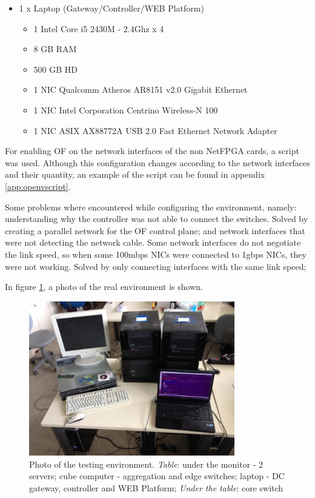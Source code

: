 \documentclass[12pt,english,oneside]{book}
\begin{document}
\begin{itemize}
    \item 1 x Laptop (Gateway/Controller/WEB Platform)
    \begin{itemize}
      \item 1 Intel Core i5 2430M - 2.4Ghz x 4
      \item 8 GB RAM
      \item 500 GB HD
      \item 1 NIC Qualcomm Atheros AR8151 v2.0 Gigabit Ethernet
      \item 1 NIC Intel Corporation Centrino Wireless-N 100
      \item 1 NIC ASIX AX88772A USB 2.0 Fast Ethernet Network Adapter
    \end{itemize}
\end{itemize}

For enabling OF on the network interfaces of the non NetFPGA cards, a script was used. Although this configuration changes according to the network interfaces and their quantity, an example of the script can be found in appendix \ref{app:openvscript}.

Some problems where encountered while configuring the environment, namely: understanding why the controller was not able to connect the switches. Solved by creating a parallel network for the OF control plane; and network interfaces that were not detecting the network cable. Some network interfaces do not negotiate the link speed, so when some 100mbps NICs were connected to 1gbps NICs, they were not working. Solved by only connecting interfaces with the same link speed;

In figure \ref{fig:realenv}, a photo of the real environment is shown.

\begin{figure}[h!tbp]
        \centering
        \includegraphics[width=0.8\textwidth]{figures/realenvironment.jpg}
        \caption{Photo of the testing environment. \textit{Table}: under the monitor - 2 servers; cube computer - aggregation and edge switches; laptop - DC gateway, controller and WEB Platform; \textit{Under the table}: core switch}
        \label{fig:realenv}
\end{figure}
\newpage
\end{document}
